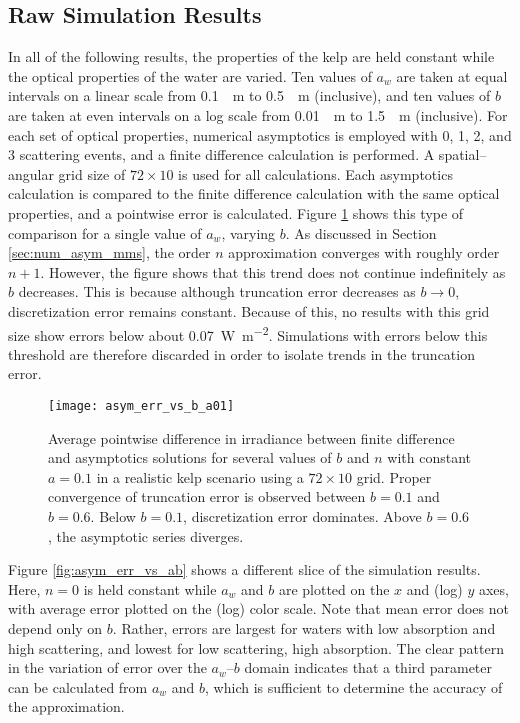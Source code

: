 \subsection{Raw Simulation Results}
\label{sec:iop_study_raw}
In all of the following results, the properties of the kelp are held constant while the optical properties of the water are varied.
Ten values of $a_w$ are taken at equal intervals on a linear scale from \SI{0.1}{\per\m} to \SI{0.5}{\per\m} (inclusive), and ten values of $b$ are taken at even intervals on a log scale from \SI{0.01}{\per\m} to \SI{1.5}{\per\m} (inclusive).
For each set of optical properties, numerical asymptotics is employed with 0, 1, 2, and 3 scattering events, and a finite difference calculation is performed.
A spatial--angular grid size of $72 \times 10$ is used for all calculations.
Each asymptotics calculation is compared to the finite difference calculation with the same optical properties, and a pointwise error is calculated.
Figure \ref{fig:asym_err_vs_b_a01} shows this type of comparison for a single value of $a_w$, varying $b$.
As discussed in Section \ref{sec:num_asym_mms}, the order $n$ approximation converges with roughly order $n+1$.
However, the figure shows that this trend does not continue indefinitely as $b$ decreases.
This is because although truncation error decreases as $b \to 0$, discretization error remains constant.
Because of this, no results with this grid size show errors below about \SI{0.07}{\W\per\m\squared}.
Simulations with errors below this threshold are therefore discarded in order to isolate trends in the truncation error.

\newcommand\rdfigwidth{4.5in}

\begin{figure}[H]
  \centering
  \texttt{[image: asym\_err\_vs\_b\_a01]}
  \caption{Average pointwise difference in irradiance between finite difference and asymptotics solutions for several values of $b$ and $n$ with constant $a=0.1$ in a realistic kelp scenario using a $72\times 10$ grid. Proper convergence of truncation error is observed between $b=0.1$ and $b=0.6$. Below $b=0.1$, discretization error dominates. Above $b=0.6$, the asymptotic series diverges.}
  \label{fig:asym_err_vs_b_a01}
\end{figure}

Figure \ref{fig:asym_err_vs_ab} shows a different slice of the simulation results.
Here, $n=0$ is held constant while $a_w$ and $b$ are plotted on the $x$ and (log) $y$ axes, with average error plotted on the (log) color scale.
Note that mean error does not depend only on $b$.
Rather, errors are largest for waters with low absorption and high scattering, and lowest for low scattering, high absorption.
The clear pattern in the variation of error over the $a_w$--$b$ domain indicates that a third parameter can be calculated from $a_w$ and $b$, which is sufficient to determine the accuracy of the approximation.

